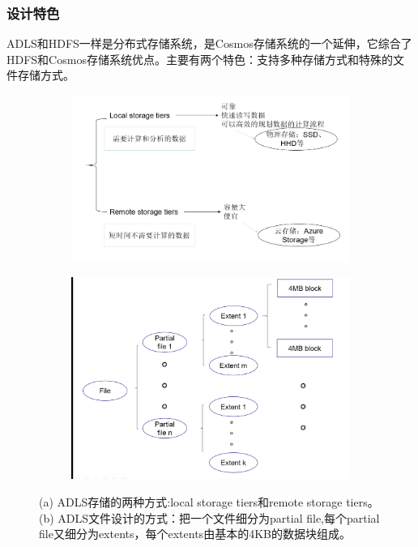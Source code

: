 \subsubsection{设计特色}
ADLS和HDFS一样是分布式存储系统，是Cosmos存储系统的一个延伸，它综合了HDFS和Cosmos存储系统优点。主要有两个特色：支持多种存储方式和特殊的文件存储方式。
\begin{figure}[!htbp]
	\begin{subfigure}[b]{0.5\linewidth}
		\includegraphics[width=\linewidth]{figs/data_store.png}
		\caption{}
		\label{fig:data_store}
	\end{subfigure}
	\begin{subfigure}[b]{0.5\linewidth}
		\includegraphics[width=0.8\linewidth]{figs/file_store.png}
		\caption{}
		\label{fig:file_store}
	\end{subfigure}
	\caption{(a) ADLS存储的两种方式:local storage tiers和remote storage tiers。(b) ADLS文件设计的方式：把一个文件细分为partial file,每个partial file又细分为extents，每个extents由基本的4KB的数据块组成。}
\end{figure}
